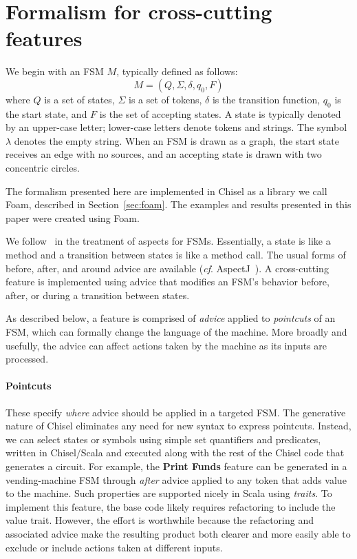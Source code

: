 \documentclass[conference]{IEEEtran}
\begin{document}
\section{Formalism for cross-cutting features}\label{sec:formal}\label{sec:ccut}
We begin with an FSM $M$, typically defined as follows: 
\[M = (Q, \Sigma, \delta, q_0, F)\]where $Q$ is a set of states, $\Sigma$ is a set of tokens, $\delta$ is the transition function, $q_0$ is the start state, and $F$ is the set of accepting states.  A state is typically denoted by an upper-case letter;  lower-case letters denote tokens and strings.  The symbol $\lambda$ denotes the empty string.  When an FSM is drawn as a graph, the start state receives an edge with no sources, and an accepting state is drawn with two concentric circles. 

The formalism presented here are implemented in Chisel as a library we call Foam, described in Section~\ref{sec:foam}.  The examples and results presented in this paper were created using Foam.  


We follow~\cite{aspectsUML} in the treatment of aspects for FSMs.  Essentially, a state is like a method and a transition between states is like a method call.  The usual forms of before, after, and around advice are available (\emph{cf}. AspectJ~\cite{AspectJ:01}).   A cross-cutting feature is implemented using advice that modifies an FSM's behavior before, after, or during a transition between states.

As described below, a feature is comprised of \emph{advice} applied to \emph{pointcuts} of an FSM, which can formally change the language of the machine.  More broadly and usefully, the advice can affect actions taken by the machine as its inputs are processed.  

\paragraph{Pointcuts} These specify \emph{where} advice should be applied in a targeted FSM.   The generative nature of Chisel eliminates any need for new syntax to express pointcuts.  Instead, we can select states or symbols using simple set quantifiers and predicates, written in Chisel/Scala and executed along with the rest of the Chisel code that generates a circuit.  For example, the \textbf{Print Funds} feature can be generated in a vending-machine FSM through \emph{after} advice applied to any token that adds value to the machine.  Such properties are supported nicely in Scala using \emph{traits}.  To implement this feature, the base code likely requires refactoring to include the value trait.  However, the effort is worthwhile because the refactoring and associated advice make the resulting product both clearer and more easily able to exclude or include actions taken at different inputs.
\end{document}
